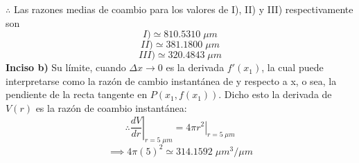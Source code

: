 $\therefore$ Las razones medias de coambio para los valores de I), II) y III) respectivamente son
$$I)\simeq 810.5310 \; \mu m$$
$$II)\simeq 381.1800\; \mu m$$
$$III)\simeq 320.4843\;\mu m$$
\textbf{Inciso b)} Su límite, cuando $\Delta x \rightarrow 0$ es la derivada $f'(x_1)$, la cual puede interpretarse como la razón de cambio instantánea de y respecto a x, o sea, la pendiente de la recta tangente en $P(x_1, f(x_1))$.
Dicho esto la derivada de $V(r)$ es la razón de coambio instantánea: $$\therefore \left.\frac{dV}{dr}\right|_{r=5\;\mu m}=\left . 4\pi r^2\right|_{r=5\;\mu m}$$
$$\implies 4\pi (5)^2\simeq 314.1592 \;\mu m^3/\mu m$$
